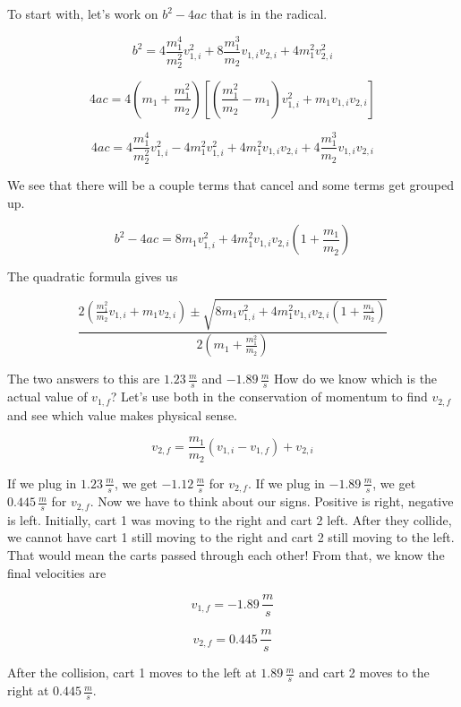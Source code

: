 \documentclass[12pt]{book}
\begin{document}
\begin{exampleblock}
To start with, let's work on $b^2 - 4ac$ that is in the radical.

\begin{equation}
b^2 = 4 \frac{m_1^4}{m_2^2} v_{1,i}^2 + 8 \frac{m_1^3}{m_2} v_{1,i} v_{2,i} + 4 m_1^2 v_{2,i}^2
\end{equation}

\begin{equation}
4ac = 4 \left( m_1 + \frac{m_1^2}{m_2} \right) \left[ \left( \frac{m_1^2}{m_2} - m_1 \right) v_{1,i}^2 + m_1 v_{1,i} v_{2,i} \right]
\end{equation}

\begin{equation}
4ac = 4 \frac{m_1^4}{m_2^2} v_{1,i}^2 - 4 m_1^2 v_{1,i}^2 + 4 m_1^2 v_{1,i}v_{2,i} + 4 \frac{m_1^3}{m_2} v_{1,i} v_{2,i}
\end{equation}

We see that there will be a couple terms that cancel and some terms get grouped up.

\begin{equation}
b^2 - 4ac = 8 m_1 v_{1,i}^2 + 4 m_1^2 v_{1,i} v_{2,i} \left( 1 + \frac{m_1}{m_2} \right)
\end{equation}

The quadratic formula gives us

\begin{equation}
\frac{2 \left(\frac{m_1^2}{m_2} v_{1,i} + m_1 v_{2,i} \right) \pm \sqrt{8 m_1 v_{1,i}^2 + 4 m_1^2 v_{1,i} v_{2,i} \left( 1 + \frac{m_1}{m_2} \right)}}{2 \left(m_1 + \frac{m_1^2}{m_2} \right)}
\end{equation}

The two answers to this are $1.23 \, \frac{m}{s}$ and $-1.89 \, \frac{m}{s}$ How do we know which is the actual value of $v_{1,f}$? Let's use both in the conservation of momentum to find $v_{2,f}$ and see which value makes physical sense.

\begin{equation}
v_{2,f} = \frac{m_1}{m_2} (v_{1,i} - v_{1,f}) + v_{2,i}
\end{equation}

If we plug in $1.23 \, \frac{m}{s}$, we get $-1.12 \, \frac{m}{s}$ for $v_{2,f}$. If we plug in $-1.89 \, \frac{m}{s}$, we get $0.445 \, \frac{m}{s}$ for $v_{2,f}$. Now we have to think about our signs. Positive is right, negative is left. Initially, cart 1 was moving to the right and cart 2 left. After they collide, we cannot have cart 1 still moving to the right and cart 2 still moving to the left. That would mean the carts passed through each other! From that, we know the final velocities are

\begin{equation}
v_{1,f} = -1.89 \, \frac{m}{s}
\end{equation}

\begin{equation}
v_{2,f} = 0.445 \, \frac{m}{s}
\end{equation}

After the collision, cart 1 moves to the left at $1.89 \, \frac{m}{s}$ and cart 2 moves to the right at $0.445 \, \frac{m}{s}$.

\end{exampleblock}
\end{document}
